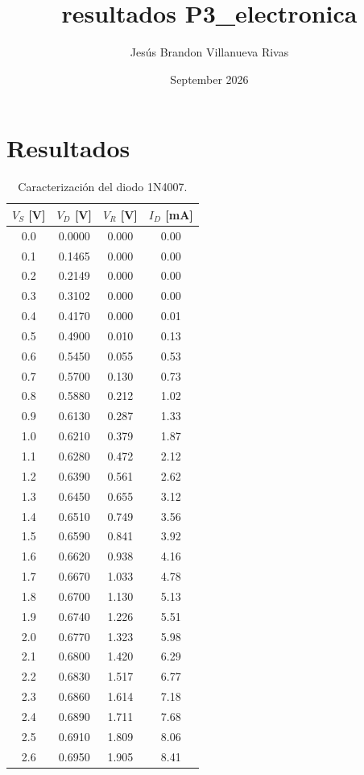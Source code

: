 \documentclass{article}
\title{resultados P3\_electronica}
\author{Jesús Brandon Villanueva Rivas}
\date{September 2026}
\begin{document}
\maketitle


\section{Resultados}

\begin{table}[htbp]
\caption{Caracterización del diodo 1N4007.}
\label{tab:dato_1N4007}
\begin{tabular}{cccc}
\toprule
$V_S$ [V] & $V_D$ [V] & $V_R$ [V] & $I_D$ [mA] \\
\midrule
0.0 & 0.0000 & 0.000 & 0.00 \\
0.1 & 0.1465 & 0.000 & 0.00 \\
0.2 & 0.2149 & 0.000 & 0.00 \\
0.3 & 0.3102 & 0.000 & 0.00 \\
0.4 & 0.4170 & 0.000 & 0.01 \\
0.5 & 0.4900 & 0.010 & 0.13 \\
0.6 & 0.5450 & 0.055 & 0.53 \\
0.7 & 0.5700 & 0.130 & 0.73 \\
0.8 & 0.5880 & 0.212 & 1.02 \\
0.9 & 0.6130 & 0.287 & 1.33 \\
1.0 & 0.6210 & 0.379 & 1.87 \\
1.1 & 0.6280 & 0.472 & 2.12 \\
1.2 & 0.6390 & 0.561 & 2.62 \\
1.3 & 0.6450 & 0.655 & 3.12 \\
1.4 & 0.6510 & 0.749 & 3.56 \\
1.5 & 0.6590 & 0.841 & 3.92 \\
1.6 & 0.6620 & 0.938 & 4.16 \\
1.7 & 0.6670 & 1.033 & 4.78 \\
1.8 & 0.6700 & 1.130 & 5.13 \\
1.9 & 0.6740 & 1.226 & 5.51 \\
2.0 & 0.6770 & 1.323 & 5.98 \\
2.1 & 0.6800 & 1.420 & 6.29 \\
2.2 & 0.6830 & 1.517 & 6.77 \\
2.3 & 0.6860 & 1.614 & 7.18 \\
2.4 & 0.6890 & 1.711 & 7.68 \\
2.5 & 0.6910 & 1.809 & 8.06 \\
2.6 & 0.6950 & 1.905 & 8.41 \\

\end{tabular}
\end{table}
\end{document}

